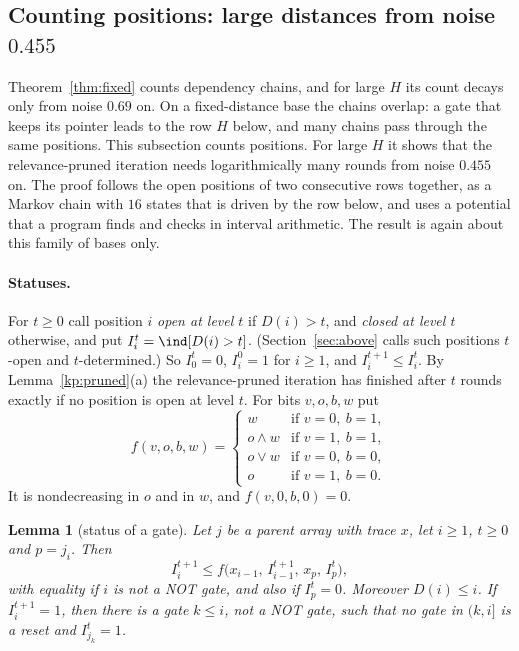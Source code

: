 \documentclass[11pt]{amsart}
\newtheorem{lemma}[theorem]{Lemma}
\theoremstyle{definition}
\theoremstyle{remark}
\begin{document}
\subsection{Counting positions: large distances from noise \texorpdfstring{$0.455$}{0.455}}\label{sec:rows}

Theorem~\ref{thm:fixed} counts dependency chains, and for large $H$ its count decays only from
noise $0.69$ on. On a fixed-distance base the chains overlap: a gate that keeps its pointer leads
to the row $H$ below, and many chains pass through the same positions. This subsection counts
positions. For large $H$ it shows that the relevance-pruned iteration needs logarithmically many
rounds from noise $0.455$ on. The proof follows the open positions of two consecutive rows
together, as a Markov chain with $16$ states that is driven by the row below, and uses a potential
that a program finds and checks in interval arithmetic. The result is again about this family of
bases only.

\paragraph{Statuses.} For $t\ge0$ call position $i$ \emph{open at level $t$} if $D(i)>t$, and
\emph{closed at level $t$} otherwise, and put $I^t_i=\ind[D(i)>t]$. (Section~\ref{sec:above} calls
such positions $t$-open and $t$-determined.) So $I^t_0=0$, $I^0_i=1$ for
$i\ge1$, and $I^{t+1}_i\le I^t_i$. By Lemma~\ref{kp:pruned}(a) the relevance-pruned iteration has
finished after $t$ rounds exactly if no position is open at level $t$. For bits $v,o,b,w$ put
\[
f(v,o,b,w)=\begin{cases}
w&\text{if }v=0,\ b=1,\\
o\wedge w&\text{if }v=1,\ b=1,\\
o\vee w&\text{if }v=0,\ b=0,\\
o&\text{if }v=1,\ b=0.
\end{cases}
\]
It is nondecreasing in $o$ and in $w$, and $f(v,0,b,0)=0$.

\begin{lemma}[status of a gate]\label{lem:rowstatus}
Let $j$ be a parent array with trace $x$, let $i\ge1$, $t\ge0$ and $p=j_i$. Then
\[
I^{t+1}_i\le f\bigl(x_{i-1},\,I^{t+1}_{i-1},\,x_p,\,I^t_p\bigr),
\]
with equality if $i$ is not a NOT gate, and also if $I^t_p=0$. Moreover $D(i)\le i$. If
$I^{t+1}_i=1$, then there is a gate $k\le i$, not a NOT gate, such that no gate in $(k,i]$ is a
reset and $I^t_{j_k}=1$.
\end{lemma}
\end{document}
